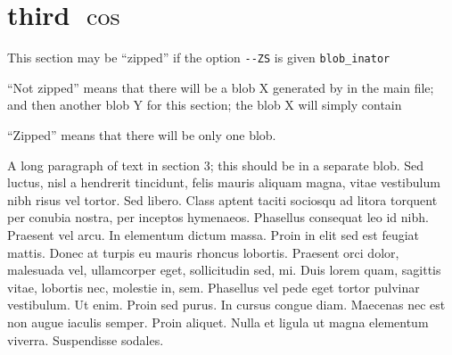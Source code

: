 \section{third $\cos$}

This section may be ``zipped'' if
the option \verb+--ZS+ is given
\verb+blob_inator+

``Not zipped'' means that there will be a blob X
generated by \verb++ in the main file;
and then another blob Y for this section;
the blob X will simply contain \verb++

``Zipped'' means that there will be only one blob.



A long paragraph of text in section 3; this should be in a separate blob.  Sed
luctus, nisl a hendrerit tincidunt, felis mauris aliquam magna, vitae
vestibulum nibh risus vel tortor. Sed libero. Class aptent taciti
sociosqu ad litora torquent per conubia nostra, per inceptos
hymenaeos. Phasellus consequat leo id nibh. Praesent vel arcu. In
elementum dictum massa. Proin in elit sed est feugiat mattis. Donec at
turpis eu mauris rhoncus lobortis. Praesent orci dolor, malesuada vel,
ullamcorper eget, sollicitudin sed, mi. Duis lorem quam, sagittis
vitae, lobortis nec, molestie in, sem. Phasellus vel pede eget tortor
pulvinar vestibulum. Ut enim. Proin sed purus. In cursus congue
diam. Maecenas nec est non augue iaculis semper. Proin aliquet. Nulla
et ligula ut magna elementum viverra. Suspendisse sodales.
